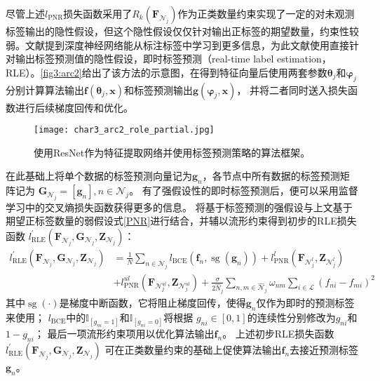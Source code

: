 尽管上述$l_{\mathrm{PNR}}$损失函数采用了$R_k\left(\boldsymbol F_{\mathcal{N}_j}\right)$作为正类数量约束实现了一定的对未观测标签输出的隐性假设，但这个隐性假设仅仅针对输出正标签的期望数量，约束性较弱。文献\parencite{Zhang_Understanding_2021}提到深度神经网络能从标注标签中学习到更多信息，为此文献\parencite{Cole_SML_2021}使用直接针对输出标签预测值的隐性假设，即时标签预测（real-time label estimation，RLE）。\autoref{fig3:arc2}给出了该方法的示意图，在得到特征向量后使用两套参数$\boldsymbol \theta_j$和$\boldsymbol\varphi_j$分别计算算法输出$\boldsymbol f\left(\boldsymbol\theta_j,\boldsymbol x\right)$和标签预测输出$\boldsymbol g\left(\boldsymbol\varphi_j,\boldsymbol x\right)$，
并将二者同时送入损失函数进行后续梯度回传和优化。
\begin{figure}
    \centering
    \texttt{[image: char3\_arc2\_role\_partial.jpg]}
    \caption{\label{fig3:arc2}使用ResNet作为特征提取网络并使用标签预测策略的算法框架。}
\end{figure}

在此基础上将单个数据的标签预测向量记为${\boldsymbol g}_n$，各节点中所有数据的标签预测矩阵记为
${\boldsymbol G}_{\mathcal{N}_j}=\left[{\boldsymbol g}_n\right],n\in\mathcal{N}_j$。
有了强假设性的即时标签预测后，便可以采用监督学习中的交叉熵损失函数获得更多的信息。
将基于标签预测的强假设与上文基于期望正标签数量的弱假设式\eqref{PNR}进行结合，并辅以流形约束得到初步的RLE损失函数
$l_{\mathrm{RLE}}^{\prime}\left(\mathbf{F}_{\mathcal{N}_j} , {\mathbf{G}}_{\mathcal{N}_j}, \mathbf{Z}_{\mathcal{N}_j}\right)$：
\begin{equation}
    \label{RLE_temp1}
    \begin{split}
        l_{\mathrm{RLE}}^{\prime}\left(\mathbf{F}_{\mathcal{N}_j} , {\mathbf{G}}_{\mathcal{N}_j}, \mathbf{Z}_{\mathcal{N}_j}\right) 
        &=\frac{1}{N} \sum_{n \in \mathcal{N}_j} l_{\mathrm{BCE}}\left(\boldsymbol{f}_{n}, \operatorname{sg}\left({\boldsymbol{g}}_{n}\right)\right)
        +l_{\mathrm{PNR}}^l\left(\boldsymbol{F}_{\mathcal{N}_j^l}, \boldsymbol{Z}_{\mathcal{N}_j^l}\right) \\
        &+l_{\mathrm{PNR}}^{ul}\left(\boldsymbol{F}_{\mathcal{N}_j^{ul}}, \boldsymbol{Z}_{\mathcal{N}_j^{ul}}\right)
        +\frac{\sigma}{2\hat{N}_j} \sum_{n,m \in \hat{\mathcal{N}}_j}{ \omega_{nm} \sum_{i \in \mathcal{L}}\left({f}_{ni}-{f}_{mi}\right)^2 }
    \end{split}
\end{equation}
其中$\operatorname{sg}\left(\cdot \right)$是梯度中断函数，它将阻止梯度回传，使得${\boldsymbol{g}}_{n}$仅作为即时的预测标签来使用；
$l_{\mathrm{BCE}}$中的$\mathbb{I}_{\left[ g_{ni}=1\right]}$和$\mathbb{I}_{\left[g_{ni}=0\right]}$将根据
$g_{ni}\in\left[0,1\right]$的连续性分别修改为$g_{ni}$和$1-g_{ni}$；
最后一项流形约束项用以优化算法输出$\boldsymbol f_n$。
上述初步RLE损失函数$l_{\mathrm{RLE}}^{\prime}\left(\mathbf{F}_{\mathcal{N}_j} , {\mathbf{G}}_{\mathcal{N}_j}, \mathbf{Z}_{\mathcal{N}_j}\right)$
可在正类数量约束的基础上促使算法输出$\boldsymbol f_n$去接近预测标签${\boldsymbol g}_n$。

